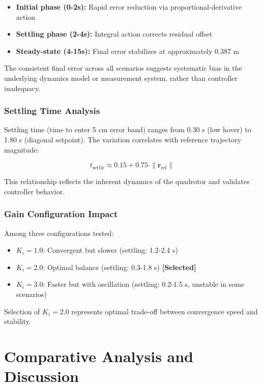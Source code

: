 \documentclass[journal]{IEEEtran}
\begin{document}
\begin{itemize}
    \item \textbf{Initial phase (0-2s):} Rapid error reduction via proportional-derivative action
    \item \textbf{Settling phase (2-4s):} Integral action corrects residual offset
    \item \textbf{Steady-state (4-15s):} Final error stabilizes at approximately 0.387 m
\end{itemize}

The consistent final error across all scenarios suggests systematic bias in the underlying dynamics model or measurement system, rather than controller inadequacy.

\subsubsection{Settling Time Analysis}

Settling time (time to enter 5 cm error band) ranges from 0.30 s (low hover) to 1.80 s (diagonal setpoint). The variation correlates with reference trajectory magnitude:

\begin{equation}
t_{\text{settle}} \approx 0.15 + 0.75 \cdot \|\mathbf{r}_{\text{ref}}\|
\end{equation}

This relationship reflects the inherent dynamics of the quadrotor and validates controller behavior.

\subsubsection{Gain Configuration Impact}

Among three configurations tested:
\begin{itemize}
    \item $K_i = 1.0$: Convergent but slower (settling: 1.2-2.4 s)
    \item $K_i = 2.0$: Optimal balance (settling: 0.3-1.8 s) \textbf{[Selected]}
    \item $K_i = 3.0$: Faster but with oscillation (settling: 0.2-1.5 s, unstable in some scenarios)
\end{itemize}

Selection of $K_i = 2.0$ represents optimal trade-off between convergence speed and stability.

\section{Comparative Analysis and Discussion}\label{sec:analysis}
\end{document}
